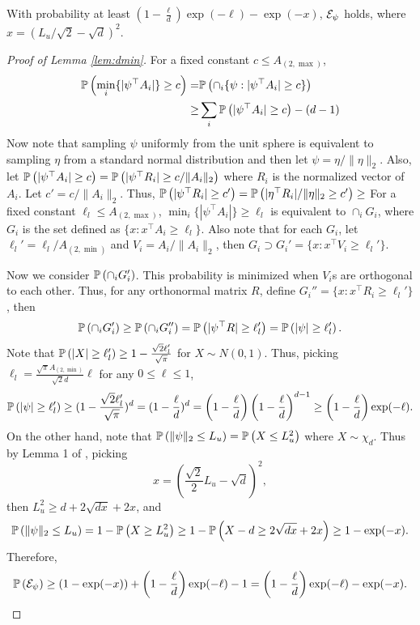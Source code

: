 \begin{lemma}
\label{lem:dmin}
With probability at least $\left(1- \frac{\ell}{d}\right)\exp(-\ell) - \exp(-x)$, $\mathcal{E}_{\psi}$ holds, where $x=(L_u/\sqrt{2}-\sqrt{d})^2$.
\end{lemma}
\begin{proof}[Proof of Lemma \ref{lem:dmin}]
For a fixed constant $c \le A_{(2,\max)}$,
\begin{align*}
\mathbb{P}\left(\min_i \{|\psi^{\top}A_i|\} \ge c\right) = & \mathbb{P}\left(\cap_i\{\psi : |\psi^{\top}A_i|\ge c\}\right)\\
 \ge & \sum_i \mathbb{P}\left(|\psi^{\top}A_i|\ge c\right) - (d-1)
\end{align*}
Now note that sampling $\psi$ uniformly from the unit sphere is equivalent to sampling $\eta$ from a standard normal distribution and then let $\psi = \eta/ \|\eta\|_2$.
Also, let $\mathbb{P}\left(|\psi^{\top}A_i|\ge c\right) = \mathbb{P}\left(|\psi^{\top}R_i|\ge c/\|A_i\|_2\right)$ where $R_i$ is the normalized vector of $A_i$. 
Let $c' = c/\|A_i\|_2$. 
Thus, $ \mathbb{P}\left(|\psi^{\top}R_i|\ge c'\right) = \mathbb{P}\left(|\eta^{\top}R_i|/\|\eta\|_2\ge c'\right) \ge $
\fi
For a fixed constant $\ell_l \le A_{(2,\max)}$, $\min_i \{|\psi^{\top}A_i|\} \ge \ell_l$ is equivalent to  $\cap_i G_i$, where $G_i$ is the set defined as $\{x: x^{\top}A_i\ge \ell_l\}$.  
Also note that for each $G_i$, let $\ell_l' = \ell_l/A_{(2,\min)}$ and $V_i = A_i/\|A_i\|_2$, then $G_i \supset G_i' = \{x: x^{\top}V_i\ge \ell_l'\}$.

Now we consider $\mathbb{P}\left(\cap_i G_i'\right)$. 
This probability is minimized when $V_i$s are orthogonal to each other. 
Thus, for any orthonormal matrix $R$, define $G_i'' = \{x: x^{\top}R_i\ge \ell_l'\}$, then 
\[
\mathbb{P}\left(\cap_i G_i'\right) \ge \mathbb{P}\left(\cap_i G_i''\right) = \mathbb{P}\left(|\psi^{\top}R| \ge \ell_l'\right) = \mathbb{P}\left(|\psi| \ge \ell_l'\right).
\]
Note that $\mathbb{P}\left(|X|\ge \ell_l'\right) \ge 1- \frac{\sqrt{2}\ell_l'}{\sqrt{\pi}}$ for $X\sim N(0,1)$. Thus, picking $\ell_l = \frac{\sqrt{\pi}A_{(2,\min)}}{\sqrt{2}d} \ell$ for any $0\le \ell \le 1$, 
\begin{equation}
\label{eq:GaussianLowerBound}
\mathbb{P}\left(|\psi| \ge \ell_l'\right) \ge (1- \frac{\sqrt{2}\ell_l'}{\sqrt{\pi}})^d = (1-\frac{\ell}{d})^d = \left(1- \frac{\ell}{d}\right)\left(1-\frac{\ell}{d}\right)^{d-1} \ge \left(1- \frac{\ell}{d}\right)\exp(-\ell).
\end{equation}
On the other hand, note that $\mathbb{P}\left(\|\psi\|_2 \le L_u\right) = \mathbb{P}\left(X \le L_u^2\right)$ where $X \sim \chi_d$.
Thus by Lemma 1 of \citep{laurent2000adaptive}, picking
\[
x = \left(\frac{\sqrt{2}}{2}L_u - \sqrt{d}\right)^2,
\]
then $L_u^2 \ge d+2\sqrt{dx}+2x$, and
\begin{equation}
\label{eq:ProbEpsi}
\mathbb{P}\left(\|\psi\|_2 \le L_u\right) = 1- \mathbb{P}\left(X\ge L_u^2\right) \ge 1- \mathbb{P}\left(X - d\ge 2\sqrt{dx} +2x\right) \ge 1-\exp(-x).
\end{equation}
Therefore, 
\begin{equation}
\label{eq:ProbEpsi2}
\mathbb{P}\left(\mathcal{E}_{\psi}\right) \ge (1-\exp(-x))+\left(1- \frac{\ell}{d}\right)\exp(-\ell)-1 = \left(1- \frac{\ell}{d}\right)\exp(-\ell)-\exp(-x).
\end{equation}
\end{proof}
